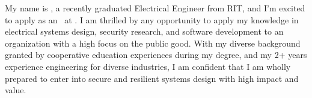 My name is \name, a recently graduated Electrical Engineer from RIT, and I'm excited to apply  
as an \targetpos\ at \company. I am thrilled by any opportunity to apply my knowledge 
in electrical systems design, security research, and software development to an organization with 
a high focus on the public good. With my diverse background granted by cooperative education 
experiences during my degree, and my 2+ years experience engineering for diverse 
industries, I am confident that I am wholly prepared to enter into secure and resilient systems 
design with high impact and value.